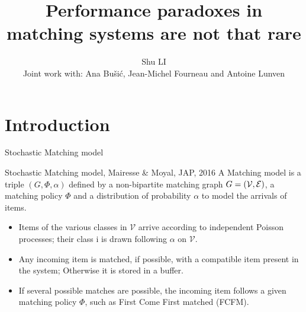 \documentclass[12pt,aspectratio=1610]{beamer}
\title{Performance paradoxes in matching systems are not that rare}
\author{{\large Shu LI}\\[7mm] 
{\normalsize  Joint work with: Ana Bu\v{s}i\'{c}, Jean-Michel Fourneau and Antoine Lunven}}
\institute[INRIA]{
{
\large NETGCOOP 2025, Bilbao }}
\date{}
\begin{document}
\begin{frame}[plain]
\maketitle
\end{frame}

\section{Introduction}
\begin{frame}{Stochastic Matching model}
\begin{block}{Stochastic Matching model, Mairesse \& Moyal, JAP, 2016 } 
A Matching model is  a triple $(G,\Phi,\alpha)$ defined by a non-bipartite matching graph $G=(\cal{V},\cal{E})$, a matching policy $\Phi$ and a distribution of probability $\alpha$ to model the arrivals of items.
\begin{itemize}
\item Items of the various classes in $\mathcal{V}$ arrive according to independent Poisson processes; their class i is drawn following $\alpha$ on $\mathcal{V}$.\\ 
\item Any incoming item is matched, if possible, with a compatible item present in the system; Otherwise it is stored in a buffer.\\ 
\item If several possible matches are possible, the incoming item follows a given matching policy $\Phi$, such as First Come First matched (FCFM).
\end{itemize}
\end{block}  
\end{frame}

\end{document}
